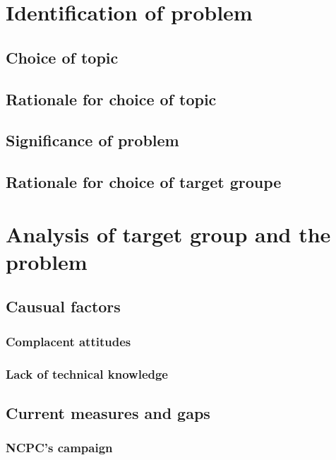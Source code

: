 \documentclass[a4paper]{article}
\begin{document}
\begin{abstract}
	\noindent
	...?
\end{abstract}

\newpage


\tableofcontents

\newpage


\begin{multicols}{2}

	\section{Identification of problem}
	\subsection{Choice of topic}
	\subsection{Rationale for choice of topic}
	\subsection{Significance of problem}
	\subsection{Rationale for choice of target groupe}

	\section{Analysis of target group and the problem}
	\subsection{Causual factors}
	\subsubsection{Complacent attitudes}
	\subsubsection{Lack of technical knowledge}
	\subsection{Current measures and gaps}
	\subsubsection{NCPC's campaign}

\end{multicols}
\end{document}
